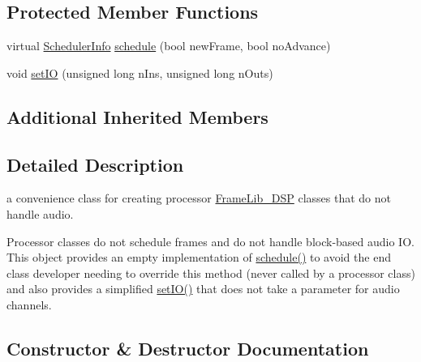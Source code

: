 \subsection*{Protected Member Functions}
\begin{DoxyCompactItemize}
\item 
virtual \hyperlink{struct_frame_lib___d_s_p_1_1_scheduler_info}{Scheduler\+Info} \hyperlink{class_frame_lib___processor_a2487e6433f6a5e79014664a0500ccc24}{schedule} (bool new\+Frame, bool no\+Advance)
\item 
void \hyperlink{class_frame_lib___processor_a84035040e5e1cff07e16502ee290881e}{set\+IO} (unsigned long n\+Ins, unsigned long n\+Outs)
\end{DoxyCompactItemize}
\subsection*{Additional Inherited Members}


\subsection{Detailed Description}
a convenience class for creating processor \hyperlink{class_frame_lib___d_s_p}{Frame\+Lib\+\_\+\+D\+SP} classes that do not handle audio. 

Processor classes do not schedule frames and do not handle block-\/based audio IO. This object provides an empty implementation of \hyperlink{class_frame_lib___processor_a2487e6433f6a5e79014664a0500ccc24}{schedule()} to avoid the end class developer needing to override this method (never called by a processor class) and also provides a simplified \hyperlink{class_frame_lib___processor_a84035040e5e1cff07e16502ee290881e}{set\+I\+O()} that does not take a parameter for audio channels. 

\subsection{Constructor \& Destructor Documentation}
\mbox{\label{class_frame_lib___processor_a8892a6fdd58d45c2182bd8dc11a92845}} 
